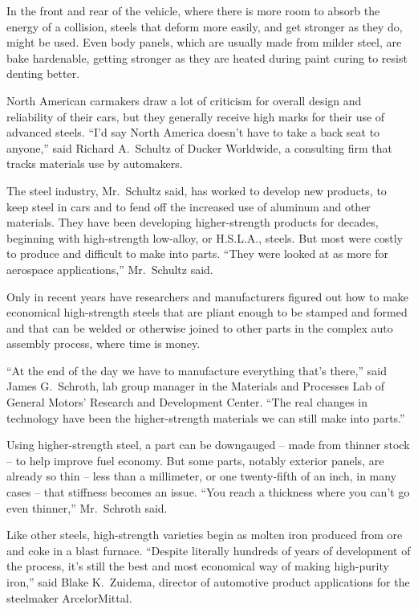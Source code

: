 ﻿\documentclass[12pt]{article}
\begin{document}
In the front and rear of the vehicle, where there is more room to absorb the energy of a collision,
steels that deform more easily, and get stronger as they do, might be used. Even body panels, which
are usually made from milder steel, are bake hardenable, getting stronger as they are heated during
paint curing to resist denting better.

North American carmakers draw a lot of criticism for overall design and reliability of their cars,
but they generally receive high marks for their use of advanced steels. ``I'd say North America
doesn't have to take a back seat to anyone,'' said Richard A.~Schultz of Ducker Worldwide, a
consulting firm that tracks materials use by automakers.

The steel industry, Mr.~Schultz said, has worked to develop new products, to keep steel in cars and
to fend off the increased use of aluminum and other materials. They have been developing
higher-strength products for decades, beginning with high-strength low-alloy, or H.S.L.A., steels.
But most were costly to produce and difficult to make into parts. ``They were looked at as more for
aerospace applications,'' Mr.~Schultz said.

Only in recent years have researchers and manufacturers figured out how to make economical
high-strength steels that are pliant enough to be stamped and formed and that can be welded or
otherwise joined to other parts in the complex auto assembly process, where time is money.

``At the end of the day we have to manufacture everything that's there,'' said James G.~Schroth, lab
group manager in the Materials and Processes Lab of General Motors' Research and Development Center.
``The real changes in technology have been the higher-strength materials we can still make into
parts.''

Using higher-strength steel, a part can be downgauged -- made from thinner stock -- to help improve
fuel economy. But some parts, notably exterior panels, are already so thin -- less than a
millimeter, or one twenty-fifth of an inch, in many cases -- that stiffness becomes an issue. ``You
reach a thickness where you can't go even thinner,'' Mr.~Schroth said.

Like other steels, high-strength varieties begin as molten iron produced from ore and coke in a
blast furnace. ``Despite literally hundreds of years of development of the process, it's still the
best and most economical way of making high-purity iron,'' said Blake K.~Zuidema, director of
automotive product applications for the steelmaker ArcelorMittal.
\end{document}
